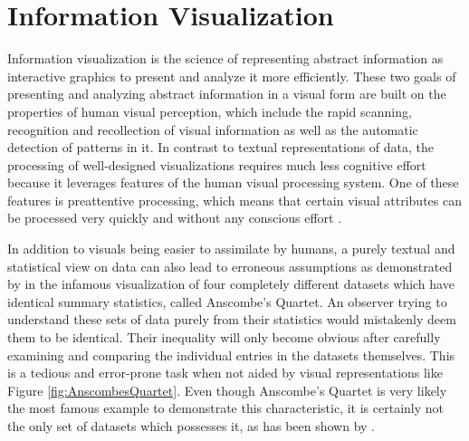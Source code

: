 \chapter{Information Visualization}
\label{chap:InfoVis}

Information visualization is the science of representing abstract information as interactive graphics to present and analyze it more efficiently.
These two goals of presenting and analyzing abstract information in a visual form are built on the properties of human visual perception, which include the rapid scanning, recognition and recollection of visual information as well as the automatic detection of patterns in it.
In contrast to textual representations of data, the processing of well-designed visualizations requires much less cognitive effort because it leverages features of the human visual processing system.
One of these features is preattentive processing, which means that certain visual attributes can be processed very quickly and without any conscious effort \parencite{PreattentiveProcessing}.

In addition to visuals being easier to assimilate by humans, a purely textual and statistical view on data can also lead to erroneous assumptions as demonstrated by \cite{AnscombesQuartet} in the infamous visualization of four completely different datasets which have identical summary statistics, called Anscombe's Quartet.
An observer trying to understand these sets of data purely from their statistics would mistakenly deem them to be identical.
Their inequality will only become obvious after carefully examining and comparing the individual entries in the datasets themselves.
This is a tedious and error-prone task when not aided by visual representations like Figure \ref{fig:AnscombesQuartet}.
Even though Anscombe's Quartet is very likely the most famous example to demonstrate this characteristic, it is certainly not the only set of datasets which possesses it, as has been shown by \cite{GenDataIdenticalStatisticsDissimilarGraphics}.

